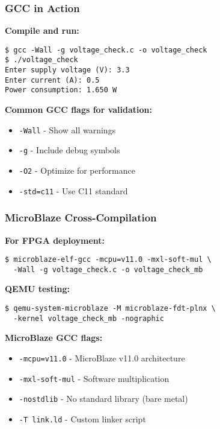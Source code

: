 \documentclass{beamer}
\begin{document}
\begin{frame}[fragile]
\frametitle{GCC in Action}
\textbf{Compile and run:}
\begin{verbatim}
$ gcc -Wall -g voltage_check.c -o voltage_check
$ ./voltage_check
Enter supply voltage (V): 3.3
Enter current (A): 0.5
Power consumption: 1.650 W
\end{verbatim}

\textbf{Common GCC flags for validation:}
\begin{itemize}
    \item \texttt{-Wall} - Show all warnings
    \item \texttt{-g} - Include debug symbols
    \item \texttt{-O2} - Optimize for performance
    \item \texttt{-std=c11} - Use C11 standard
\end{itemize}
\end{frame}

\begin{frame}[fragile]
\frametitle{MicroBlaze Cross-Compilation}
\textbf{For FPGA deployment:}
\begin{verbatim}
$ microblaze-elf-gcc -mcpu=v11.0 -mxl-soft-mul \
  -Wall -g voltage_check.c -o voltage_check_mb
\end{verbatim}

\textbf{QEMU testing:}
\begin{verbatim}
$ qemu-system-microblaze -M microblaze-fdt-plnx \
  -kernel voltage_check_mb -nographic
\end{verbatim}

\textbf{MicroBlaze GCC flags:}
\begin{itemize}
    \item \texttt{-mcpu=v11.0} - MicroBlaze v11.0 architecture
    \item \texttt{-mxl-soft-mul} - Software multiplication
    \item \texttt{-nostdlib} - No standard library (bare metal)
    \item \texttt{-T link.ld} - Custom linker script
\end{itemize}
\end{frame}
\end{document}
